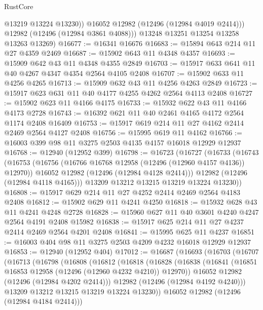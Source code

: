 \begin{lexlean}{RustCore}
\begin{coremodule}
              @13219
              @13224
              @13230))
          @16052
          @12982
          (@12496 (@12984 @4019 @2414)))
        @12982
        (@12496 (@12984 @3861 @4088)))
      @13248
      @13251
      @13254
      @13258
      @13263
      @13269)
@16677 := @16341 @16676
@16683 := @15894 @643 @214 @11 @27 @4359 @2469
@16687 := @15902 @643 @11 @4348 @4357
@16693 := @15909 @642 @43 @11 @4348 @4355 @2849
@16703 := @15917 @633 @641 @11 @40 @4267 @4347 @4354 @2564 @4105 @2408
@16707 := @15902 @633 @11 @4256 @4265
@16713 := @15909 @632 @43 @11 @4256 @4263 @2849
@16723 := @15917 @623 @631 @11 @40 @4177 @4255 @4262 @2564 @4113 @2408
@16727 := @15902 @623 @11 @4166 @4175
@16733 := @15932 @622 @43 @11 @4166 @4173 @2728
@16743 := @16392 @621 @11 @40 @2461 @4165 @4172 @2564 @1174 @2408 @16409
@16753 := @15917 @619 @214 @11 @27 @4162 @2414 @2469 @2564 @4127 @2408
@16756 := @15995 @619 @11 @4162
@16766 := @16003 @399 @98 @11 @3275 @2503 @4135 @4157 @16018 @12929 @12937
@16768 := @12940 (@12952 @399)
@16798 := @16723
    (@16727
      (@16733
        (@16743
          (@16753
            (@16756 (@16766 @16768 @12958 (@12496 (@12960 @4157 @4136)) @12970))
            @16052
            @12982
            (@12496 (@12984 @4128 @2414)))
          @12982
          (@12496 (@12984 @4118 @4165)))
        @13209
        @13212
        @13215
        @13219
        @13224
        @13230))
@16808 := @15917 @629 @214 @11 @27 @4252 @2414 @2469 @2564 @4183 @2408
@16812 := @15902 @629 @11 @4241 @4250
@16818 := @15932 @628 @43 @11 @4241 @4248 @2728
@16828 := @15960 @627 @11 @40 @3601 @4240 @4247 @2564 @4191 @2408 @15982
@16838 := @15917 @625 @214 @11 @27 @4237 @2414 @2469 @2564 @4201 @2408
@16841 := @15995 @625 @11 @4237
@16851 := @16003 @404 @98 @11 @3275 @2503 @4209 @4232 @16018 @12929 @12937
@16853 := @12940 (@12952 @404)
@17012 := @16687
    (@16693
      (@16703
        (@16707
          (@16713
            (@16798
              (@16808
                (@16812
                  (@16818
                    (@16828
                      (@16838
                        (@16841 (@16851 @16853 @12958 (@12496 (@12960 @4232 @4210)) @12970))
                        @16052
                        @12982
                        (@12496 (@12984 @4202 @2414)))
                      @12982
                      (@12496 (@12984 @4192 @4240)))
                    @13209
                    @13212
                    @13215
                    @13219
                    @13224
                    @13230))
                @16052
                @12982
                (@12496 (@12984 @4184 @2414)))

\end{coremodule}
\end{lexlean}
